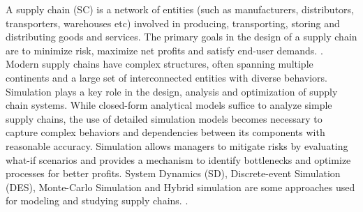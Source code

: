 A supply chain (SC) is a network of entities (such as manufacturers, distributors, transporters, warehouses etc) involved in producing, transporting, storing and distributing goods and services. The primary goals in the design of a supply chain are to minimize risk, maximize net profits and satisfy end-user demands. \cite{chopra2007supply}. Modern supply chains have complex structures, often spanning multiple continents and a large set of interconnected entities with diverse behaviors. 
Simulation plays a key role in the design, analysis and optimization of supply chain systems.  While closed-form analytical models suffice to analyze simple supply chains, the use of detailed simulation models becomes necessary to capture complex behaviors and dependencies between its components with reasonable accuracy. Simulation allows managers to mitigate risks by evaluating what-if scenarios and provides a mechanism to identify bottlenecks and optimize processes for better profits. 
System Dynamics (SD), Discrete-event Simulation (DES), Monte-Carlo Simulation and Hybrid simulation are some approaches used for modeling and studying supply chains. \cite{Mustafee}. 

